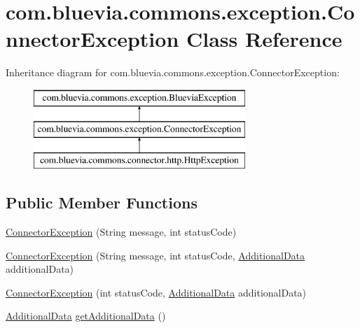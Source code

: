 \hypertarget{classcom_1_1bluevia_1_1commons_1_1exception_1_1ConnectorException}{
\section{com.bluevia.commons.exception.ConnectorException Class Reference}
\label{classcom_1_1bluevia_1_1commons_1_1exception_1_1ConnectorException}
}
Inheritance diagram for com.bluevia.commons.exception.ConnectorException:\begin{figure}[H]
\begin{center}
\leavevmode
\includegraphics[height=3.000000cm]{classcom_1_1bluevia_1_1commons_1_1exception_1_1ConnectorException}
\end{center}
\end{figure}
\subsection*{Public Member Functions}
\begin{DoxyCompactItemize}
\item 
\hyperlink{classcom_1_1bluevia_1_1commons_1_1exception_1_1ConnectorException_ab45813e8e44e82f8f7c4bd736a285ade}{ConnectorException} (String message, int statusCode)
\item 
\hyperlink{classcom_1_1bluevia_1_1commons_1_1exception_1_1ConnectorException_af68c6b17fa08d443420ce7d1d646b717}{ConnectorException} (String message, int statusCode, \hyperlink{classcom_1_1bluevia_1_1commons_1_1connector_1_1http_1_1AdditionalData}{AdditionalData} additionalData)
\item 
\hyperlink{classcom_1_1bluevia_1_1commons_1_1exception_1_1ConnectorException_ad93e1d4297739b437cd47aaee3edad38}{ConnectorException} (int statusCode, \hyperlink{classcom_1_1bluevia_1_1commons_1_1connector_1_1http_1_1AdditionalData}{AdditionalData} additionalData)
\item 
\hyperlink{classcom_1_1bluevia_1_1commons_1_1connector_1_1http_1_1AdditionalData}{AdditionalData} \hyperlink{classcom_1_1bluevia_1_1commons_1_1exception_1_1ConnectorException_ad8ba6829595330eeac007448d436ba1a}{getAdditionalData} ()
\end{DoxyCompactItemize}


